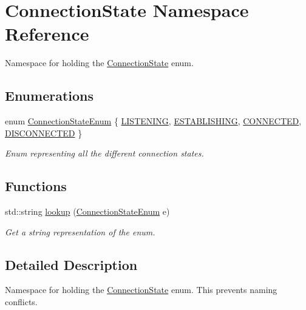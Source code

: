\hypertarget{namespaceConnectionState}{
\section{ConnectionState Namespace Reference}
\label{namespaceConnectionState}
}


Namespace for holding the \hyperlink{namespaceConnectionState}{ConnectionState} enum.  


\subsection*{Enumerations}
\begin{DoxyCompactItemize}
\item 
enum \hyperlink{namespaceConnectionState_ad1b6674b6f1c58f17e9db75d0a77149f}{ConnectionStateEnum} \{ \hyperlink{namespaceConnectionState_ad1b6674b6f1c58f17e9db75d0a77149fa29532bebee105202d6575b23b3fb8df6}{LISTENING}, 
\hyperlink{namespaceConnectionState_ad1b6674b6f1c58f17e9db75d0a77149fa3be514d893d22241ee8bd05f1f128641}{ESTABLISHING}, 
\hyperlink{namespaceConnectionState_ad1b6674b6f1c58f17e9db75d0a77149fa9a42fe676b268943da19108e9f5cb2a2}{CONNECTED}, 
\hyperlink{namespaceConnectionState_ad1b6674b6f1c58f17e9db75d0a77149fa7388bea4debc0d7ee1b10fd6cc53012e}{DISCONNECTED}
 \}
\begin{DoxyCompactList}\small\item\em Enum representing all the different connection states. \item\end{DoxyCompactList}\end{DoxyCompactItemize}
\subsection*{Functions}
\begin{DoxyCompactItemize}
\item 
std::string \hyperlink{namespaceConnectionState_aec53b086156059b62bbbf5e2e24ec50b}{lookup} (\hyperlink{namespaceConnectionState_ad1b6674b6f1c58f17e9db75d0a77149f}{ConnectionStateEnum} e)
\begin{DoxyCompactList}\small\item\em Get a string representation of the enum. \item\end{DoxyCompactList}\end{DoxyCompactItemize}


\subsection{Detailed Description}
Namespace for holding the \hyperlink{namespaceConnectionState}{ConnectionState} enum. This prevents naming conflicts. 


